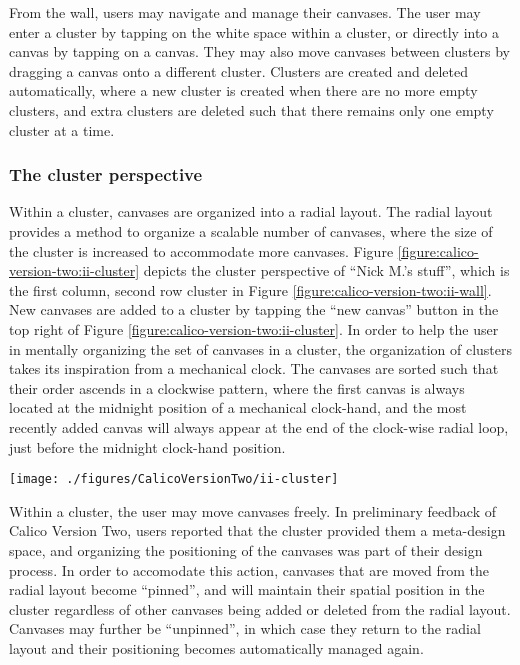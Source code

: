 From the wall, users may navigate and manage their canvases. The user may enter a cluster by tapping on the white space within a cluster, or directly into a canvas by tapping on a canvas. They may also move canvases between clusters by dragging a canvas onto a different cluster. Clusters are created and deleted automatically, where a new cluster is created when there are no more empty clusters, and extra clusters are deleted such that there remains only one empty cluster at a time.

\subsubsection{The cluster perspective}

Within a cluster, canvases are organized into a radial layout. The radial layout provides a method to organize a scalable number of canvases, where the size of the cluster is increased to accommodate more canvases. Figure \ref{figure:calico-version-two:ii-cluster} depicts the cluster perspective of ``Nick M.'s stuff'', which is the first column, second row cluster in Figure \ref{figure:calico-version-two:ii-wall}. New canvases are added to a cluster by tapping the ``new canvas'' button in the top right of Figure \ref{figure:calico-version-two:ii-cluster}. In order to help the user in mentally organizing the set of canvases in a cluster, the organization of clusters takes its inspiration from a mechanical clock. The canvases are sorted such that their order ascends in a clockwise pattern, where the first canvas is always located at the midnight position of a mechanical clock-hand, and the most recently added canvas will always appear at the end of the clock-wise radial loop, just before the midnight clock-hand position. 

\begin{figure*}[tbh]
  \centering
  \texttt{[image: ./figures/CalicoVersionTwo/ii-cluster]}
  \caption{The cluster perspective of ``Nick M.'s stuff''.}
  \label{figure:calico-version-two:ii-cluster}
\end{figure*}

Within a cluster, the user may move canvases freely. In preliminary feedback of Calico Version Two, users reported that the cluster provided them a meta-design space, and organizing the positioning of the canvases was part of their design process. In order to accomodate this action, canvases that are moved from the radial layout become ``pinned'', and will maintain their spatial position in the cluster regardless of other canvases being added or deleted from the radial layout. Canvases may further be ``unpinned'', in which case they return to the radial layout and their positioning becomes automatically managed again.


